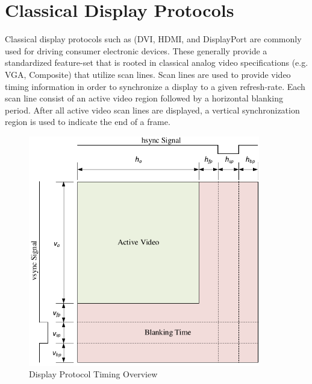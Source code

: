 


\section{Classical Display Protocols}
    \label{sec:classical_display_protocols}

    Classical display protocols such as (DVI\cite{DDWG1999}, HDMI\cite{HDMIForum2018}, and DisplayPort\cite{VESA2016} are commonly used for driving consumer electronic devices. These generally provide a standardized feature-set that is rooted in classical analog video specifications (e.g. VGA, Composite)\cite{NIAnalog} that utilize scan lines\cite{Neal1998}. Scan lines are used to provide video timing information in order to synchronize a display to a given refresh-rate. Each scan line consist of an active video region followed by a horizontal blanking period. After all active video scan lines are displayed, a vertical synchronization region is used to indicate the end of a frame.

    \begin{figure}
        \centering
        \includegraphics[width=0.9\textwidth]{fig/display_timing_overview.pdf}
        \caption{Display Protocol Timing Overview}
        \label{fig:display_protocol_timing_overview}
    \end{figure}

